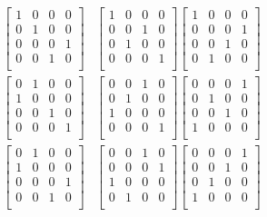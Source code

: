 \begin{align*}
 \begin{bmatrix}
 1 & 0 & 0 & 0 \\
 0 & 1 & 0 & 0 \\
 0 & 0 & 0 & 1 \\
 0 & 0 & 1 & 0 \\
 \end{bmatrix}
 &\begin{bmatrix}
 1 & 0 & 0 & 0 \\
 0 & 0 & 1 & 0 \\
 0 & 1 & 0 & 0 \\
 0 & 0 & 0 & 1 \\
 \end{bmatrix}
 \begin{bmatrix}
 1 & 0 & 0 & 0 \\
 0 & 0 & 0 & 1 \\
 0 & 0 & 1 & 0 \\
 0 & 1 & 0 & 0 \\
 \end{bmatrix}   \\
 \begin{bmatrix}
 0 & 1 & 0 & 0 \\
 1 & 0 & 0 & 0 \\
 0 & 0 & 1 & 0 \\
 0 & 0 & 0 & 1 \\
 \end{bmatrix}
 &\begin{bmatrix}
 0 & 0 & 1 & 0 \\
 0 & 1 & 0 & 0 \\
 1 & 0 & 0 & 0 \\
 0 & 0 & 0 & 1 \\
 \end{bmatrix}
 \begin{bmatrix}
 0 & 0 & 0 & 1 \\
 0 & 1 & 0 & 0 \\
 0 & 0 & 1 & 0 \\
 1 & 0 & 0 & 0 \\
 \end{bmatrix}   \\
 \begin{bmatrix}
 0 & 1 & 0 & 0 \\
 1 & 0 & 0 & 0 \\
 0 & 0 & 0 & 1 \\
 0 & 0 & 1 & 0 \\
 \end{bmatrix}
 &\begin{bmatrix}
 0 & 0 & 1 & 0 \\
 0 & 0 & 0 & 1 \\
 1 & 0 & 0 & 0 \\
 0 & 1 & 0 & 0 \\
 \end{bmatrix}
 \begin{bmatrix}
 0 & 0 & 0 & 1 \\
 0 & 0 & 1 & 0 \\
 0 & 1 & 0 & 0 \\
 1 & 0 & 0 & 0 \\
 \end{bmatrix}   \\
\end{align*}

